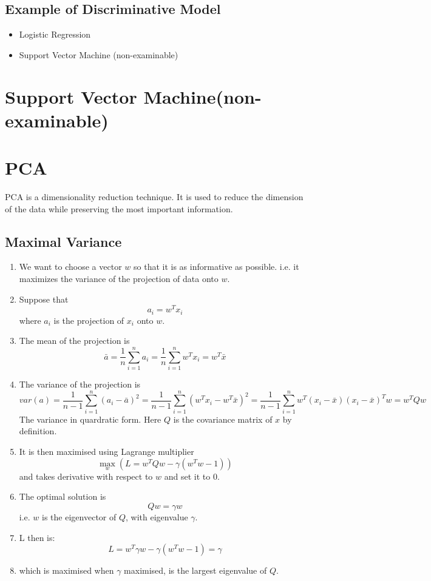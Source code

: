 \documentclass[12pt,a4paper]{article}
\begin{document}
\subsection{Example of Discriminative Model}
\begin{itemize}
    \item Logistic Regression
    \item Support Vector Machine (non-examinable)
\end{itemize}

\section{Support Vector Machine(non-examinable)}

\section{PCA}
    PCA is a dimensionality reduction technique. It is used to reduce the dimension of the data while preserving the most important information.
    \subsection{Maximal Variance}
    \begin{enumerate}
        \item We want to choose a vector $w$ so that it is as informative as possible. i.e. it maximizes the variance of the projection of data onto $w$.
        \item Suppose that 
        $$
        a_i = w^T x_i
        $$
        where $a_i$ is the projection of $x_i$ onto $w$.
        \item The mean of the projection is
        $$
        \bar{a} = \frac{1}{n} \sum_{i=1}^n a_i = \frac{1}{n} \sum_{i=1}^n w^T x_i = w^T \bar{x}
        $$
        \item The variance of the projection is
        $$
        var(a) = \frac{1}{n-1} \sum_{i=1}^n \left(a_i - \bar{a}\right)^2 = \frac{1}{n-1} \sum_{i=1}^n \left(w^T x_i - w^T \bar{x}\right)^2 = \frac{1}{n-1} \sum_{i=1}^n w^T \left(x_i - \bar{x}\right) \left(x_i - \bar{x}\right)^T w = w^T Q w
        $$
        The variance in quardratic form.
        Here $Q$ is the covariance matrix of $x$ by definition.
        \item It is then maximised using Lagrange multiplier
        $$
        \max_w (L = w^T Q w - \gamma \left(w^T w - 1\right))
        $$
        and takes derivative with respect to $w$ and set it to 0.
        \item The optimal solution is 
        $$
        Qw = \gamma w
        $$ 
        i.e. $w$ is the eigenvector of $Q$, with eigenvalue $\gamma$.
        \item L then is:
        $$
        L = w^T \gamma w - \gamma \left(w^T w - 1\right) = \gamma
        $$
        \item which is maximised when $\gamma$ maximised, is the largest eigenvalue of $Q$.

    \end{enumerate}
\end{document}
